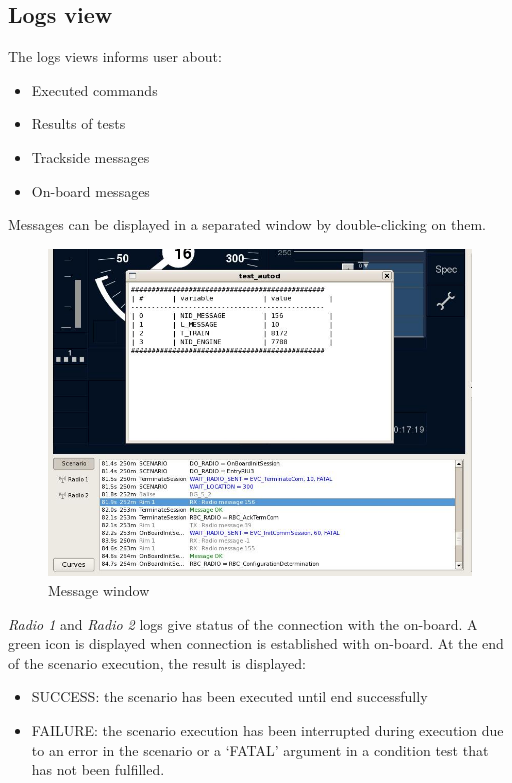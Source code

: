 \subsection{Logs view}
The logs views informs user about:
\begin{itemize}
\item Executed commands
\item Results of tests
\item Trackside messages
\item On-board messages
\end{itemize}
Messages can be displayed in a separated window by double-clicking on them.
\newline
\begin{figure}[h]
  \centering
  \includegraphics[width=\textwidth]{image/test_runner_message_window.jpg}
  \caption{Message window}
  \label{fig:Message window}
\end{figure}
\emph{Radio 1} and \emph{Radio 2} logs give status of the connection with the on-board. A green icon is displayed when connection is established with on-board.
At the end of the scenario execution, the result is displayed:
\begin{itemize}
\item SUCCESS: the scenario has been executed until end successfully
\item FAILURE: the scenario execution has been interrupted during execution due to an error in the scenario or a ‘FATAL’ argument in a condition test that has not been fulfilled.
\end{itemize}
